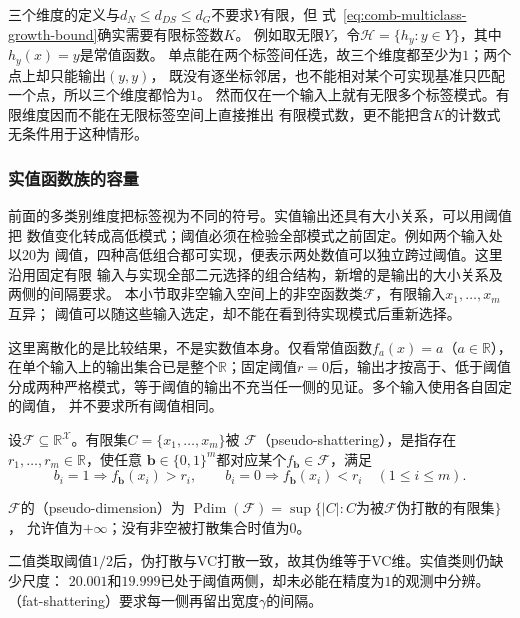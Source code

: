 三个维度的定义与$d_N\leq d_{DS}\leq d_G$不要求$Y$有限，但
式~\eqref{eq:comb-multiclass-growth-bound}确实需要有限标签数$K$。
例如取无限$Y$，令$\mathcal H=\{h_y:y\in Y\}$，其中$h_y(x)=y$是常值函数。
单点能在两个标签间任选，故三个维度都至少为$1$；两个点上却只能输出$(y,y)$，
既没有逐坐标邻居，也不能相对某个可实现基准只匹配一个点，所以三个维度都恰为$1$。
然而仅在一个输入上就有无限多个标签模式。有限维度因而不能在无限标签空间上直接推出
有限模式数，更不能把含$K$的计数式无条件用于这种情形。

\subsubsection{实值函数族的容量}
\label{sec:comb-real-valued-threshold-margins}

前面的多类别维度把标签视为不同的符号。实值输出还具有大小关系，可以用阈值把
数值变化转成高低模式；阈值必须在检验全部模式之前固定。例如两个输入处以$20$为
阈值，四种高低组合都可实现，便表示两处数值可以独立跨过阈值。这里沿用固定有限
输入与实现全部二元选择的组合结构，新增的是输出的大小关系及两侧的间隔要求。
本小节取非空输入空间上的非空函数类$\mathcal F$，有限输入$x_1,\ldots,x_m$互异；
阈值可以随这些输入选定，却不能在看到待实现模式后重新选择。

这里离散化的是比较结果，不是实数值本身。仅看常值函数$f_a(x)=a$（$a\in\mathbb R$），
在单个输入上的输出集合已是整个$\mathbb R$；固定阈值$r=0$后，输出才按高于、低于阈值
分成两种严格模式，等于阈值的输出不充当任一侧的见证。多个输入使用各自固定的阈值，
并不要求所有阈值相同。

\begin{definition}[伪打散]
\label{def:pseudo-shattering}
设$\mathcal F\subseteq\mathbb R^{\mathcal X}$。有限集$C=\{x_1,\ldots,x_m\}$被
$\mathcal F$（pseudo-shattering），是指存在$r_1,\ldots,r_m\in\mathbb R$，使任意
$\bm b\in\{0,1\}^m$都对应某个$f_{\bm b}\in\mathcal F$，满足
\[
 b_i=1\Rightarrow f_{\bm b}(x_i)>r_i,\qquad
 b_i=0\Rightarrow f_{\bm b}(x_i)<r_i\quad(1\leq i\leq m).
\]
\end{definition}
\begin{definition}[伪维]
\label{def:pseudo-dimension}
$\mathcal F$的（pseudo-dimension）为
$\operatorname{Pdim}(\mathcal F)=\sup\{|C|:C\text{为被}\mathcal F\text{伪打散的有限集}\}$，
允许值为$+\infty$；没有非空被打散集合时值为$0$。
\end{definition}

二值类取阈值$1/2$后，伪打散与VC打散一致，故其伪维等于VC维。实值类则仍缺少尺度：
$20.001$和$19.999$已处于阈值两侧，却未必能在精度为$1$的观测中分辨。
（fat-shattering）要求每一侧再留出宽度$\gamma$的间隔。

